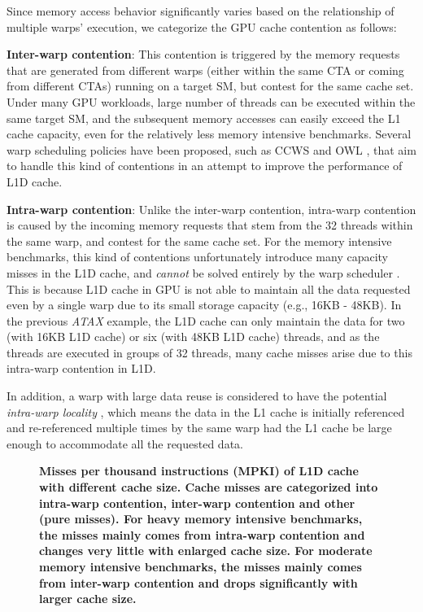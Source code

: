 \documentclass{sigplanconf}
\begin{document}
Since memory access behavior significantly varies based on the relationship of multiple warps' execution, we categorize the GPU cache contention as follows:

\noindent\textbf{Inter-warp contention}: This contention is triggered by the memory requests that are generated from different warps (either within the same CTA or coming from different CTAs) running on a target SM, but contest for the same cache set. Under many GPU workloads, large number of threads can be executed within the same target SM, and the subsequent memory accesses can easily exceed the L1 cache capacity, even for the relatively less memory intensive benchmarks. Several warp scheduling policies have been proposed, such as CCWS \cite{rogers2012cache} and OWL \cite{jog2013owl}, that aim to handle this kind of contentions in an attempt to improve the performance of L1D cache.

\noindent\textbf{Intra-warp contention}: Unlike the inter-warp contention, intra-warp contention is caused by the incoming memory requests that stem from the 32 threads within the same warp, and contest for the same cache set. For the memory intensive benchmarks, this kind of contentions unfortunately introduce many capacity misses in the L1D cache, and \textit{cannot} be solved entirely by the warp scheduler \cite{jia2014mrpb}. This is because L1D cache in GPU is not able to maintain all the data requested even by a single warp due to its small storage capacity (e.g., 16KB - 48KB). In the previous \textit{ATAX} example, the L1D cache can only maintain the data for two (with 16KB L1D cache) or six (with 48KB L1D cache) threads, and as the threads are executed in groups of 32 threads, many cache misses arise due to this intra-warp contention in L1D.

In addition, a warp with large data reuse is considered to have the potential \textit{intra-warp locality} \cite{rogers2012cache}, which means the data in the L1 cache is initially referenced and re-referenced multiple times by the same warp had the L1 cache be large enough to accommodate all the requested data.

\begin{figure}
\begin{center}
\end{center}
\vspace{-10pt}
\caption{\textbf{Misses per thousand instructions (MPKI) of L1D cache with different cache size. Cache misses are categorized into intra-warp contention, inter-warp contention and other (pure misses). For heavy memory intensive benchmarks, the misses mainly comes from intra-warp contention and changes very little with enlarged cache size. For moderate memory intensive benchmarks, the misses mainly comes from inter-warp contention and drops significantly with larger cache size.\label{fig:mpki}}}
\end{figure}
\end{document}

